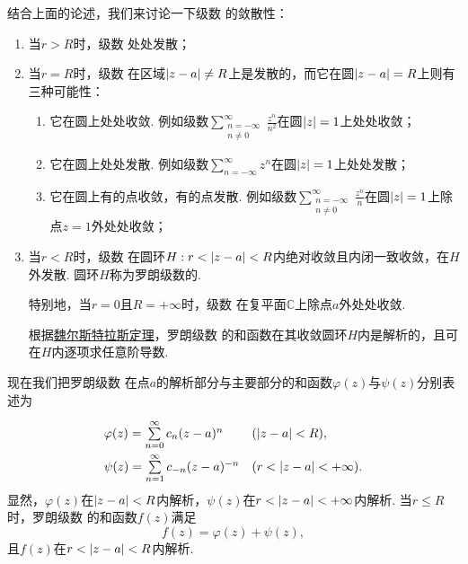 结合上面的论述，我们来讨论一下级数  的敛散性：
\begin{enumerate}
\item 当\(r > R\)时，级数  处处发散；

\item 当\(r = R\)时，级数  在区域\(\abs{z-a} \neq R\)上是发散的，而它在圆\(\abs{z-a}=R\)上则有三种可能性：\begin{enumerate}
\item 它在圆上处处收敛.
例如级数\(\sum\limits_{\substack{n=-\infty \\ n\neq0}}^{\infty} \frac{z^n}{n^2}\)在圆\(\abs{z}=1\)上处处收敛；

\item 它在圆上处处发散.
例如级数\(\sum\limits_{n=-\infty}^{\infty} z^n\)在圆\(\abs{z}=1\)上处处发散；

\item 它在圆上有的点收敛，有的点发散.
例如级数\(\sum\limits_{\substack{n=-\infty \\ n\neq0}}^{\infty} \frac{z^n}{n}\)在圆\(\abs{z}=1\)上除点\(z=1\)外处处收敛；
\end{enumerate}

\item 当\(r < R\)时，级数  在圆环\(H: r < \abs{z-a} < R\)内绝对收敛且内闭一致收敛，在\(H\)外发散.
圆环\(H\)称为罗朗级数的.

特别地，当\(r = 0\)且\(R = +\infty\)时，级数  在复平面\(\mathbb{C}\)上除点\(a\)外处处收敛.

根据\hyperref[theorem:解析函数的级数表示.魏尔斯特拉斯定理]{魏尔斯特拉斯定理}，罗朗级数  的和函数在其收敛圆环\(H\)内是解析的，且可在\(H\)内逐项求任意阶导数.
\end{enumerate}

现在我们把罗朗级数  在点\(a\)的解析部分与主要部分的和函数\(\varphi(z)\)与\(\psi(z)\)分别表述为\[
\def\arraystretch{2}
\begin{array}{ll}
\varphi(z) = \sum\limits_{n=0}^{\infty} c_n (z-a)^n & (\abs{z-a}<R), \\
\psi(z) = \sum\limits_{n=1}^{\infty} c_{-n} (z-a)^{-n} & (r < \abs{z-a} < +\infty).
\end{array}
\]显然，\(\varphi(z)\)在\(\abs{z-a}<R\)内解析，\(\psi(z)\)在\(r<\abs{z-a}<+\infty\)内解析.
当\(r \leqslant R\)时，罗朗级数  的和函数\(f(z)\)满足\[
f(z) = \varphi(z) + \psi(z),
\]且\(f(z)\)在\(r<\abs{z-a}<R\)内解析.

